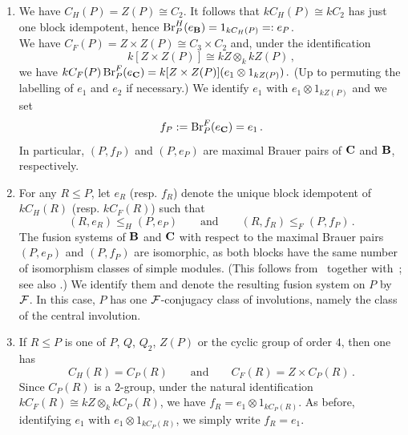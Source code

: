 \begin{nota}\label{nota:Section_3A6_part_II}\leavevmode 
\begin{enumerate}[label=(\arabic*),start=13]
    \item\label{nota:local-3A6} 
    We have $C_H(P)=Z(P)\cong C_2$. It follows that $kC_H(P)\cong kC_2$ has just one block idempotent, hence $\operatorname{Br}^H_P(e_{{\mathbf{B}}})=1_{kC_H(P)}=:e_P$.\\
    We have $C_F(P)=Z\times Z(P)\cong C_3\times C_2$ and, under the identification
        \[
            k[Z\times Z(P)]\cong kZ\otimes_k kZ(P)\,,
        \]
    we have
        \(
            kC_F(P)\operatorname{Br}^F_P(e_{\mathbf{C}})=k[Z\times Z(P)](e_1\otimes 1_{kZ(P)})\,.
\)
(Up to permuting the labelling of $e_1$ and $e_2$ if necessary.)
We identify $e_1$ with $e_1\otimes 1_{kZ(P)}$ and we set 
\[
f_P:=\operatorname{Br}^F_P(e_{\mathbf{C}})=e_1\,.
\]
In particular, $(P,f_P)$ and $(P,e_P)$ are maximal Brauer pairs of ${\mathbf{C}}$ and ${\mathbf{B}}$, respectively.

\item For any $R\le P$, let $e_R$ (resp. $f_R$) denote the unique block idempotent of $kC_H(R)$ (resp. $kC_F(R)$) such that 
\[(R,e_R)\le_H(P,e_P)\qquad\text{and}\qquad (R,f_R)\le_F (P,f_P)\,.
\] 
The fusion systems of ${\mathbf{B}}$ and ${\mathbf{C}}$ with respect to the maximal Brauer pairs $(P,e_P)$ and $(P,f_P)$ are isomorphic, 
as both blocks have the same number of isomorphism classes of simple modules. 
(This follows from~\cite[Part IV, Section 5.7]{AschKessOli11} together
with~\cite{BrauerDihedral}; see also \cite[Theorem 8.1(2)]{Sambale14}.)
We identify them and denote the resulting fusion system on $P$ by~$\mathcal{F}$. In this case, $P$ has one $\mathcal{F}$-conjugacy class of involutions, namely the class of the central involution. 
%
\item \label{rem:local-3A6}
     If $R\le P$ is one of $P$, $Q$, $Q_2$, $Z(P)$ or the cyclic group of order $4$, then one has
    \[
    C_H(R)=C_P(R)\qquad\text{and}\qquad C_F(R)=Z\times C_P(R)\,.
    \]
    Since $C_P(R)$ is a $2$-group, under the natural identification $kC_F(R)\cong kZ\otimes_k kC_P(R)$, we have $f_R=e_1\otimes 1_{kC_P(R)}$. As before, identifying $e_1$ with $e_1\otimes 1_{kC_P(R)}$, we simply write $f_R=e_1$.
\end{enumerate}
\end{nota}    


